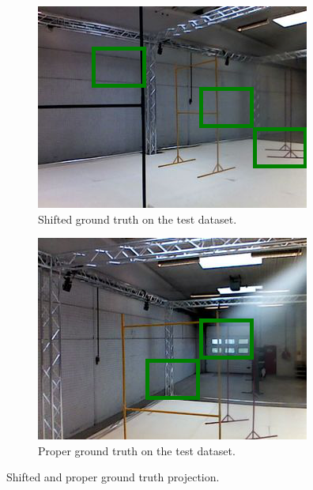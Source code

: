 \begin{figure}[h]
	\centering
	\begin{subfigure}{0.49\textwidth}
		\includegraphics[width=\textwidth]{figure/shifted_gt.png}
		\caption{Shifted ground truth on the test dataset.}
		\label{fig:bad-gt}
	\end{subfigure}
	\begin{subfigure}{0.49\textwidth}
		\includegraphics[width=\textwidth]{figure/good_gt.png}
		\caption{Proper ground truth on the test dataset.}
		\label{fig:good-gt}
	\end{subfigure}
	\caption[Shifted and proper ground truth projection]{Shifted and proper
	ground truth projection.}
	\label{fig:bad-good-gt}
\end{figure}

